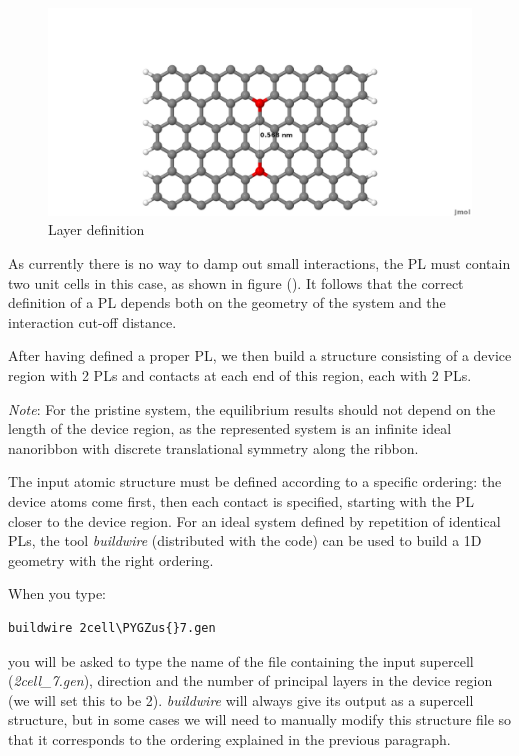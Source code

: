\documentclass[a4paper,11pt,english]{sphinxmanual}
\def\PYGZus{\char`\_}
\begin{document}
{{\begin{figure}[htbp]
\includegraphics[width=0.800\linewidth]{4cell_7.png}
\caption{Layer definition}\label{transport:fig-4cell-7}\end{figure}

As currently there is no way to damp out small interactions, the PL
must contain two unit cells in this case, as shown in figure
{\hyperref[transport:fig-4cell-7]{\emph{}}} (). It follows that the correct definition of a PL
depends both on the geometry of the system and the interaction cut-off
distance.

After having defined a proper PL, we then build a structure consisting
of a device region with 2 PLs and contacts at each end of this region,
each with 2 PLs.

\emph{Note}: For the pristine system, the equilibrium results should not
depend on the length of the device region, as the represented system
is an infinite ideal nanoribbon with discrete translational symmetry
along the ribbon.

The input atomic structure must be defined according to a specific
ordering: the device atoms come first, then each contact is specified,
starting with the PL closer to the device region. For an ideal system
defined by repetition of identical PLs, the tool \emph{buildwire}
(distributed with the code) can be used to build a 1D geometry with
the right ordering.

When you type:

\begin{Verbatim}[commandchars=\\\{\}]
buildwire 2cell\PYGZus{}7.gen
\end{Verbatim}

you will be asked to type the name of the file containing the input
supercell (\emph{2cell\_7.gen}), direction and the number of principal layers in the
device region (we will set this to be 2). \emph{buildwire} will always give
its output as a supercell structure, but in some cases we will need to
manually modify this structure file so that it corresponds to the
ordering explained in the previous paragraph.

}}
\end{document}
